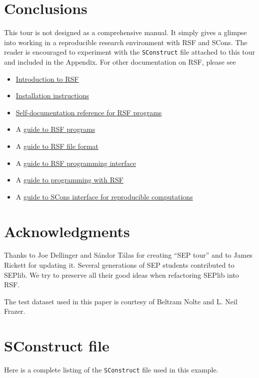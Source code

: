 \section{Conclusions}

This tour is not designed as a comprehensive manual. It simply gives a
glimpse into working in a reproducible research environment with RSF
and SCons. The reader is encouraged to experiment with the
\texttt{SConstruct} file attached to this tour and included in the
Appendix. For other documentation on RSF, please see
\begin{itemize}
\item \href{http://www.reproducibility.org/RSF/book/rsf/rsf/tour_html/}{Introduction to RSF}  
\item  \href{http://www.reproducibility.org/RSF/book/rsf/rsf/install_html/}{Installation instructions}
\item \href{http://www.reproducibility.org/RSF/}{Self-documentation reference for RSF programs}
\item A \href{http://www.reproducibility.org/RSF/book/rsf/rsf/prog_html/}{guide to RSF programs}
\item A \href{http://www.reproducibility.org/RSF/book/rsf/rsf/format_html/}
  {guide to RSF file format}
\item A \href{http://www.reproducibility.org/RSF/book/rsf/rsf/api_html/}{guide to
    RSF programming interface}
\item A \href{http://www.reproducibility.org/RSF/book/rsf/rsf/demo_html/}{guide to programming with RSF}
\item A
  \href{http://www.reproducibility.org/RSF/book/rsf/scons/paper_html/}{guide
    to SCons interface for reproducible computations}
\end{itemize}

\section{Acknowledgments}

Thanks to Joe Dellinger and S\'{a}ndor T\'{a}las for creating ``SEP
tour'' and to James Rickett for updating it. Several generations of
SEP students contributed to SEPlib. We try to preserve all their good
ideas when refactoring SEPlib into RSF.

The test dataset used in this paper is courtesy of Beltram Nolte and L. Neil Frazer.




\appendix
\section{SConstruct file}

Here is a complete listing of the \texttt{SConstruct} file used in this
example.



